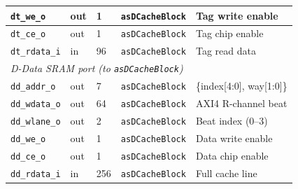 \begin{table}[H]
\begin{tabularx}{\textwidth}{|l |l |l |l |X|}
  \hline
  \texttt{dt\_we\_o}    & out & 1   & \texttt{asDCacheBlock} & Tag write enable \\
  \hline
  \texttt{dt\_ce\_o}    & out & 1   & \texttt{asDCacheBlock} & Tag chip enable \\
  \hline
  \texttt{dt\_rdata\_i} & in  & 96  & \texttt{asDCacheBlock} & Tag read data \\
  \hline
  \multicolumn{5}{|l|}{\textit{D-Data SRAM port (to \texttt{asDCacheBlock})}} \\
  \hline
  \texttt{dd\_addr\_o}  & out & 7   & \texttt{asDCacheBlock} & \{index[4:0], way[1:0]\} \\
  \hline
  \texttt{dd\_wdata\_o} & out & 64  & \texttt{asDCacheBlock} & AXI4 R-channel beat \\
  \hline
  \texttt{dd\_wlane\_o} & out & 2   & \texttt{asDCacheBlock} & Beat index (0--3) \\
  \hline
  \texttt{dd\_we\_o}    & out & 1   & \texttt{asDCacheBlock} & Data write enable \\
  \hline
  \texttt{dd\_ce\_o}    & out & 1   & \texttt{asDCacheBlock} & Data chip enable \\
  \hline
  \texttt{dd\_rdata\_i} & in  & 256 & \texttt{asDCacheBlock} & Full cache line \\
  \hline
\end{tabularx}
\end{table}

